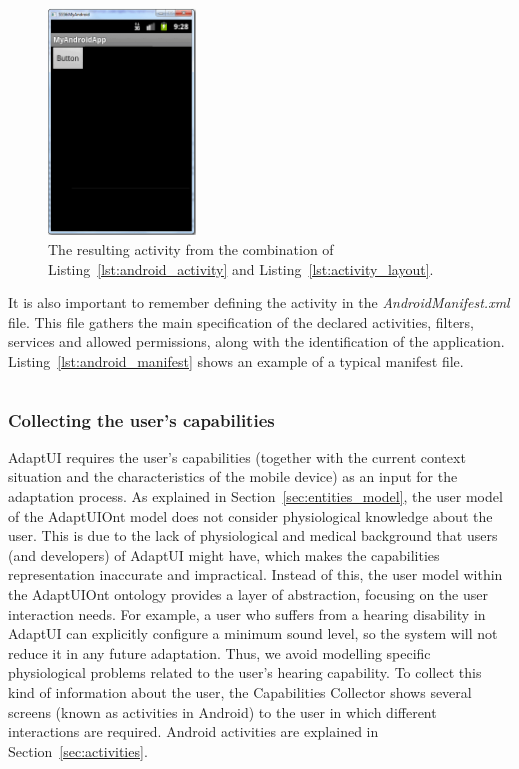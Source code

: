 \begin{figure}
\centering
\includegraphics[width=0.35\textwidth]{android_activity.png}
\caption{The resulting activity from the combination of Listing~\ref{lst:android_activity} and
Listing~\ref{lst:activity_layout}.}
\label{fig:android_activity}
\end{figure}

It is also important to remember defining the activity in the \textit{AndroidManifest.xml}
file. This file gathers the main specification of the declared activities, filters,
services and allowed permissions, along with the identification of the application.
Listing~\ref{lst:android_manifest} shows an example of a typical manifest file.

\inputminted[linenos=true, fontsize=\footnotesize, frame=lines]{xml}{4_system_architecture/android_manifest.xml}

\subsubsection{Collecting the user's capabilities}
\label{sec:user_capabilities}

AdaptUI requires the user's capabilities (together with the current context
situation and the characteristics of the mobile device) as an input  for the
adaptation process. As explained in Section~\ref{sec:entities_model}, the user
model of the AdaptUIOnt model does not consider physiological knowledge about
the user. This is due to the lack of physiological and medical background that
users (and developers) of AdaptUI might have, which makes the capabilities
representation inaccurate and impractical. Instead of this, the user model
within the AdaptUIOnt ontology provides a layer of abstraction, focusing on the
user interaction needs. For example, a user who suffers from a hearing disability
in AdaptUI can explicitly configure a minimum sound level, so the system will
not reduce it in any future adaptation. Thus, we avoid modelling specific
physiological problems related to the user's hearing capability. To collect this
kind of information about the user, the Capabilities Collector shows several
screens (known as activities in Android) to the user in which different
interactions are required. Android activities are explained in Section~\ref{sec:activities}.

